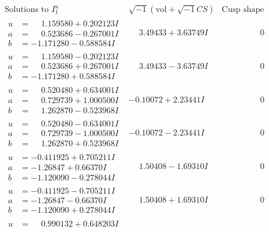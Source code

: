 \documentclass[1p]{elsarticle_modified}
\theoremstyle{definition}
\newcommand{\I}{\sqrt{-1}}
\begin{document}
$$\begin{array}{c|c|c}
\text{Solutions to }I^u_{1}& \I (\text{vol} + \sqrt{-1}CS) & \text{Cusp shape}\\
 \hline 
\begin{aligned}
u &= \phantom{-}1.159580 + 0.202123 I \\
a &= \phantom{-}0.523686 - 0.267001 I \\
b &= -1.171280 - 0.588584 I\end{aligned}
 & \phantom{-}3.49433 + 3.63749 I & \phantom{-0.000000 } 0 \\ \hline\begin{aligned}
u &= \phantom{-}1.159580 - 0.202123 I \\
a &= \phantom{-}0.523686 + 0.267001 I \\
b &= -1.171280 + 0.588584 I\end{aligned}
 & \phantom{-}3.49433 - 3.63749 I & \phantom{-0.000000 } 0 \\ \hline\begin{aligned}
u &= \phantom{-}0.520480 + 0.634001 I \\
a &= \phantom{-}0.729739 + 1.000500 I \\
b &= \phantom{-}1.262870 - 0.523968 I\end{aligned}
 & -0.10072 + 2.23441 I & \phantom{-0.000000 } 0 \\ \hline\begin{aligned}
u &= \phantom{-}0.520480 - 0.634001 I \\
a &= \phantom{-}0.729739 - 1.000500 I \\
b &= \phantom{-}1.262870 + 0.523968 I\end{aligned}
 & -0.10072 - 2.23441 I & \phantom{-0.000000 } 0 \\ \hline\begin{aligned}
u &= -0.411925 + 0.705211 I \\
a &= -1.26847 + 0.66370 I \\
b &= -1.120090 - 0.278044 I\end{aligned}
 & \phantom{-}1.50408 - 1.69310 I & \phantom{-0.000000 } 0 \\ \hline\begin{aligned}
u &= -0.411925 - 0.705211 I \\
a &= -1.26847 - 0.66370 I \\
b &= -1.120090 + 0.278044 I\end{aligned}
 & \phantom{-}1.50408 + 1.69310 I & \phantom{-0.000000 } 0 \\ \hline\begin{aligned}
u &= \phantom{-}0.990132 + 0.648203 I \\

\end{aligned}
\end{array}$$
\end{document}
